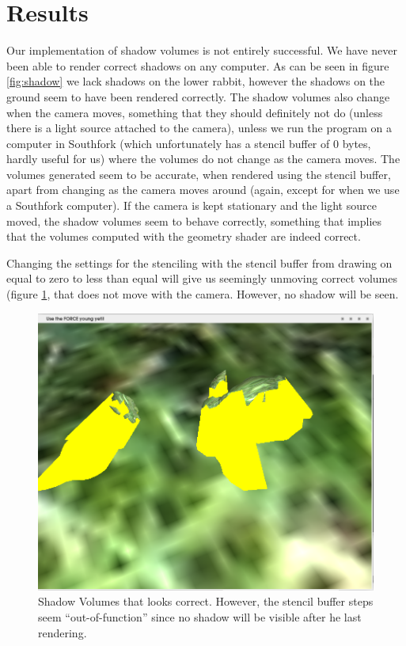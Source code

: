 \documentclass[a4paper, 12pt]{article}
\begin{document}
\section{Results}
Our implementation of shadow volumes is not entirely successful. We have never been able to render correct shadows on any computer. As can be seen in figure \ref{fig:shadow} we lack shadows on the lower rabbit, however the shadows on the ground seem to have been rendered correctly. The shadow volumes also change when the camera moves, something that they should definitely not do (unless there is a light source attached to the camera), unless we run the program on a computer in Southfork (which unfortunately has a stencil buffer of 0 bytes, hardly useful for us) where the volumes do not change as the camera moves. The volumes generated seem to be accurate, when rendered using the stencil buffer, apart from changing as the camera moves around (again, except for when we use a Southfork computer). If the camera is kept stationary and the light source moved, the shadow volumes seem to behave correctly, something that implies that the volumes computed with the geometry shader are indeed correct.

Changing the settings for the stenciling with the stencil buffer from drawing on equal to zero to less than equal will give us seemingly unmoving correct volumes (figure \ref{fig:volumes}, that does not move with the camera. However, no shadow will be seen.

\begin{figure}[h]
\centering
\includegraphics[width=\textwidth]{volumes.png}
\caption{Shadow Volumes that looks correct. However, the stencil buffer steps seem ``out-of-function'' since no shadow will be visible after he last rendering.}
\label{fig:volumes}
\end{figure}
\end{document}
